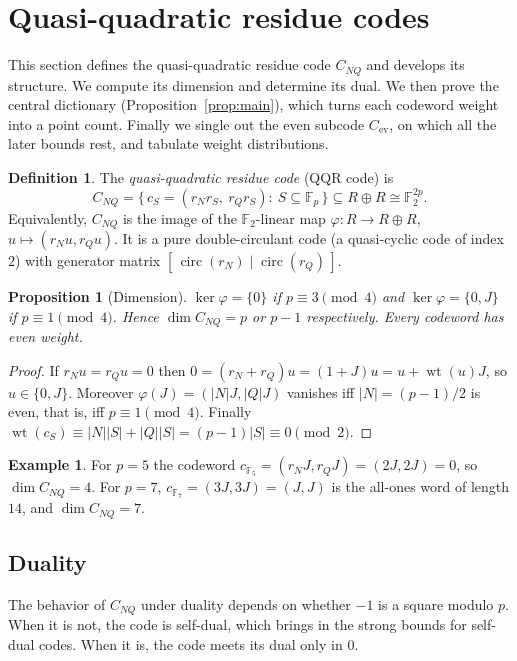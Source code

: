\documentclass[12pt,letterpaper]{article}
\newtheorem{proposition}[theorem]{Proposition}
\theoremstyle{definition}
\newtheorem{definition}[theorem]{Definition}
\newtheorem{example}[theorem]{Example}
\theoremstyle{remark}
\numberwithin{equation}{section}
\newcommand{\F}{\mathbb{F}}
\newcommand{\Fp}{\mathbb{F}_p}
\newcommand{\wt}{\operatorname{wt}}
\newcommand{\CNQ}{C_{NQ}}
\newcommand{\Cev}{C_{\mathrm{ev}}}
\begin{document}
\section{Quasi-quadratic residue codes}
\label{sec:QQR}

This section defines the quasi-quadratic residue code $\CNQ$ and develops its
structure. We compute its dimension and determine its dual. We then prove the
central dictionary (Proposition~\ref{prop:main}), which turns each codeword weight
into a point count. Finally we single out the even subcode $\Cev$, on which all the
later bounds rest, and tabulate weight distributions.

\begin{definition}\label{def:QQR}
The \emph{quasi-quadratic residue code} (QQR code) is
\[
\CNQ=\{\,c_S=(r_Nr_S,\ r_Qr_S):\ S\subseteq\Fp\,\}\subseteq R\oplus R\cong\F_2^{2p}.
\]
Equivalently, $\CNQ$ is the image of the $\F_2$-linear map $\varphi:R\to R\oplus R$,
$u\mapsto(r_Nu,r_Qu)$. It is a pure double-circulant code (a quasi-cyclic code of
index~$2$) with generator matrix $[\,\operatorname{circ}(r_N)\mid\operatorname{circ}(r_Q)\,]$.
\end{definition}

\begin{proposition}[Dimension]\label{prop:dim}
$\ker\varphi=\{0\}$ if $p\equiv3\pmod 4$ and $\ker\varphi=\{0,J\}$ if
$p\equiv1\pmod4$. Hence $\dim\CNQ=p$ or $p-1$ respectively. Every codeword has
even weight.
\end{proposition}

\begin{proof}
If $r_Nu=r_Qu=0$ then $0=(r_N+r_Q)u=(1+J)u=u+\wt(u)J$, so $u\in\{0,J\}$. Moreover
$\varphi(J)=(|N|J,|Q|J)$ vanishes iff $|N|=(p-1)/2$ is even, that is, iff
$p\equiv1\pmod4$. Finally
$\wt(c_S)\equiv|N||S|+|Q||S|=(p-1)|S|\equiv0\pmod2$.
\end{proof}

\begin{example}\label{ex:dim}
For $p=5$ the codeword $c_{\F_5}=(r_NJ,r_QJ)=(2J,2J)=0$, so $\dim C_{NQ}=4$. For
$p=7$, $c_{\F_7}=(3J,3J)=(J,J)$ is the all-ones word of length $14$, and
$\dim C_{NQ}=7$.
\end{example}

\subsection{Duality}
The behavior of $\CNQ$ under duality depends on whether $-1$ is a square modulo
$p$. When it is not, the code is self-dual, which brings in the strong bounds for
self-dual codes. When it is, the code meets its dual only in $0$.
\end{document}

